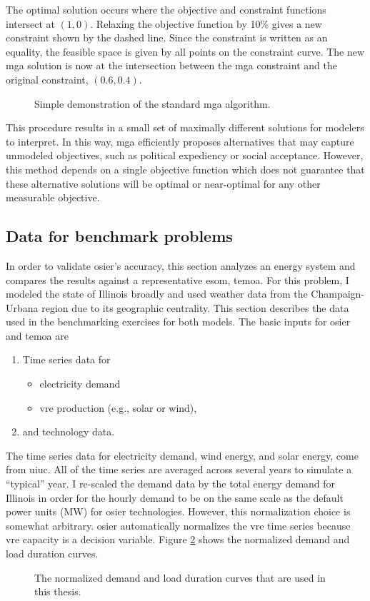 The optimal solution occurs where the objective and constraint functions
intersect at $\left(1,0\right)$. Relaxing the objective function by 10\% gives a
new constraint shown by the dashed line. Since the constraint is written as an
equality, the feasible space is given by all points on the constraint curve. The
new \ac{mga} solution is now at the intersection between the \ac{mga} constraint and the
original constraint, $\left(0.6, 0.4\right)$.

\begin{figure}[h]
  \centering
  \resizebox{0.75\columnwidth}{!}{}
  \caption{Simple demonstration of the standard \ac{mga} algorithm.}
  \label{fig:standard_mga}
\end{figure}
\FloatBarrier

This procedure results in a small set of maximally different solutions for
modelers to interpret. In this way, \ac{mga} efficiently proposes alternatives
that may capture unmodeled objectives, such as political expediency or social
acceptance. However, this method depends on a single objective function which
does not guarantee that these alternative solutions will be optimal or
near-optimal for any other measurable objective.

\subsection{Data for benchmark problems}
 In order to validate \ac{osier}'s accuracy, this section analyzes an energy
system and compares the results against a representative \ac{esom}, \ac{temoa}.
For this problem, I modeled the state of Illinois broadly and used
weather data from the Champaign-Urbana region due to its geographic centrality.
This section describes the data used in the benchmarking exercises for both models. 
The basic inputs for \ac{osier} and \ac{temoa} are
\begin{enumerate}
    \item Time series data for
    \begin{itemize}
      \item electricity demand
      \item \ac{vre} production (e.g., solar or wind),
    \end{itemize} 
    \item and technology data.
\end{enumerate}
\noindent
The time series data for electricity demand, wind energy, and solar energy, come
from \acs{uiuc}. All of the time series are averaged across several years to
simulate a ``typical'' year. I re-scaled the demand data by the total energy
demand for Illinois in order for the hourly demand to be on the same scale as
the default power units (MW) for \ac{osier} technologies. However, this
normalization choice is somewhat arbitrary. \ac{osier} automatically normalizes
the \ac{vre} time series because \ac{vre} capacity is a decision variable.
Figure \ref{fig:normalized_ldc} shows the normalized demand and load duration
curves.


 \begin{figure}[h]
  \centering
  \resizebox{1\columnwidth}{!}{}
  \caption{The normalized demand and load duration curves that are used in this thesis.}
  \label{fig:normalized_ldc}
\end{figure}

\FloatBarrier